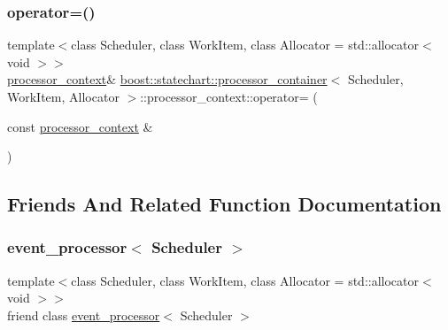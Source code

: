 \subsubsection{\texorpdfstring{operator=()}{operator=()}}
{\footnotesize\ttfamily template$<$class Scheduler, class Work\+Item, class Allocator = std\+::allocator$<$ void $>$$>$ \\
\mbox{\hyperlink{classboost_1_1statechart_1_1processor__container_1_1processor__context}{processor\+\_\+context}}\& \mbox{\hyperlink{classboost_1_1statechart_1_1processor__container}{boost\+::statechart\+::processor\+\_\+container}}$<$ Scheduler, Work\+Item, Allocator $>$\+::processor\+\_\+context\+::operator= (\begin{DoxyParamCaption}\item[{const \mbox{\hyperlink{classboost_1_1statechart_1_1processor__container_1_1processor__context}{processor\+\_\+context}} \&}]{ }\end{DoxyParamCaption})\hspace{0.3cm}{\ttfamily [private]}}



\subsection{Friends And Related Function Documentation}
\mbox{\label{classboost_1_1statechart_1_1processor__container_1_1processor__context_ab7e5334f86946211938fa5d51a3fcfd2}} 
\subsubsection{\texorpdfstring{event\+\_\+processor$<$ Scheduler $>$}{event\_processor< Scheduler >}}
{\footnotesize\ttfamily template$<$class Scheduler, class Work\+Item, class Allocator = std\+::allocator$<$ void $>$$>$ \\
friend class \mbox{\hyperlink{classboost_1_1statechart_1_1event__processor}{event\+\_\+processor}}$<$ Scheduler $>$\hspace{0.3cm}{\ttfamily [friend]}}

